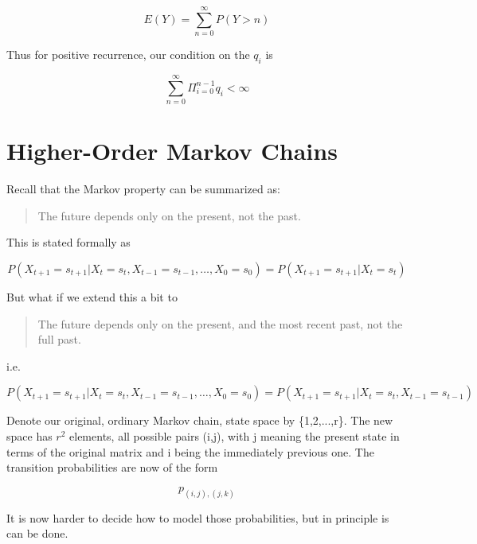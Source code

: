\begin{equation}
E(Y)=\sum ^{\infty }_{n=0}P(Y>n)
\end{equation}

Thus for positive recurrence, our condition on the $q_i$ is

\begin{equation}
\sum ^{\infty }_{n=0}\Pi ^{n-1}_{i=0}q_{i}<\infty 
\end{equation} 

\section{Higher-Order Markov Chains}

Recall that the Markov property can be summarized as:

\begin{quote}
The future depends only on the present, not the past.
\end{quote} 

This is stated formally as

\begin{equation}
P(X_{t+1}=s_{t+1}|X_{t}=s_{t},X_{t-1}=s_{t-1},\ldots ,X_{0}=s_{0})=P(X_{t+1}=s_{t+1}|X_{t}=s_{t})
\end{equation}

But what if we extend this a bit to

\begin{quote}
The future depends only on the present, and the most recent past, not
the full past.
\end{quote}  

i.e.

\begin{equation}
P(X_{t+1}=s_{t+1}|X_{t}=s_{t},X_{t-1}=s_{t-1},\ldots
,X_{0}=s_{0})=P(X_{t+1}=s_{t+1}|X_{t}=s_{t}, X_{t-1} = s_{t-1})
\end{equation}

Denote our original, ordinary Markov chain,  state space by
\{1,2,...,r\}.  The new space has $r^2$ elements, all possible pairs
(i,j), with j meaning the present state in terms of the original matrix
and i being the immediately previous one.  The transition probabilities
are now of the form

\begin{equation}
p_{(i,j),(j,k)}
\end{equation}

It is now harder to decide how to model those probabilities, but in
principle is can be done.


